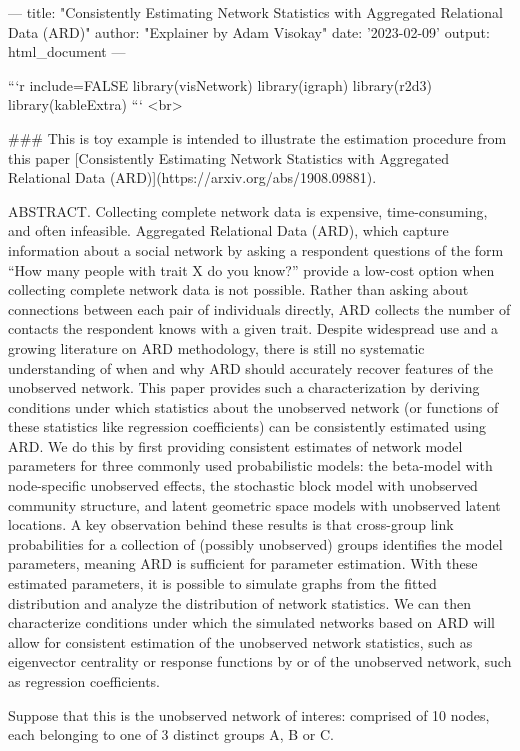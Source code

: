 ---
title: "Consistently Estimating Network Statistics with Aggregated Relational Data (ARD)"
author: "Explainer by Adam Visokay"
date: '2023-02-09'
output: html_document
---

```{r include=FALSE}
library(visNetwork)
library(igraph)
library(r2d3)
library(kableExtra)
```
<br>

### This is toy example is intended to illustrate the estimation procedure from this paper [Consistently Estimating Network Statistics with Aggregated Relational Data (ARD)](https://arxiv.org/abs/1908.09881). 

ABSTRACT. Collecting complete network data is expensive, time-consuming, and often infeasible. Aggregated Relational Data (ARD), which capture information about a social network by asking a respondent questions of the form ``How many people with trait X do you know?'' provide a low-cost option when collecting complete network data is not possible. Rather than asking about connections between each pair of individuals directly, ARD collects the number of contacts the respondent knows with a given trait. Despite widespread use and a growing literature on ARD methodology, there is still no systematic understanding of when and why ARD should accurately recover features of the unobserved network. This paper provides such a characterization by deriving conditions under which statistics about the unobserved network (or functions of these statistics like regression coefficients) can be consistently estimated using ARD. We do this by first providing consistent estimates of network model parameters for three commonly used probabilistic models: the beta-model with node-specific unobserved effects, the stochastic block model with unobserved community structure, and latent geometric space models with unobserved latent locations. A key observation behind these results is that cross-group link probabilities for a collection of (possibly unobserved) groups identifies the model parameters, meaning ARD is sufficient for parameter estimation. With these estimated parameters, it is possible to simulate graphs from the fitted distribution and analyze the distribution of network statistics. We can then characterize conditions under which the simulated networks based on ARD will allow for consistent estimation of the unobserved network statistics, such as eigenvector centrality or response functions by or of the unobserved network, such as regression coefficients.

Suppose that this is the unobserved network of interes: comprised of 10 nodes, each belonging to one of 3 distinct groups A, B or C. 

